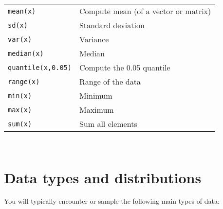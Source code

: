 \begin{tabular}{p{3.5cm} p{9.5cm}}
	{\tt mean(x)} & Compute mean (of a vector or matrix)\\
	{\tt sd(x)} & Standard deviation\\
	{\tt var(x)} & Variance\\
	{\tt median(x)} & Median\\
	{\tt quantile(x,0.05)} & Compute the 0.05 quantile\\
	{\tt range(x)} & Range of the data\\
	{\tt min(x)} & Minimum\\
	{\tt max(x)} & Maximum\\
	{\tt sum(x)} & Sum all elements\\
\end{tabular}\\

\section{Data types and distributions}
You will typically encounter or sample the following main types of 
data:

